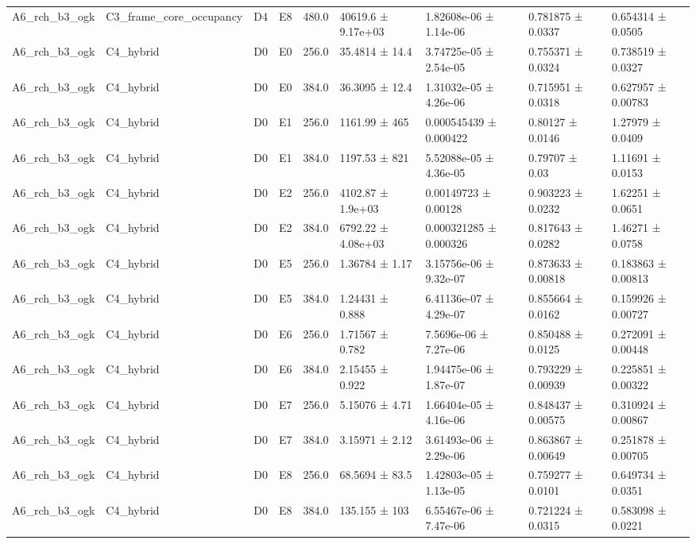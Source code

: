 \begin{table}
\begin{tabular}{lllllllll}
A6\_rch\_b3\_ogk & C3\_frame\_core\_occupancy & D4 & E8 & 480.0 & 40619.6 ± 9.17e+03 & 1.82608e-06 ± 1.14e-06 & 0.781875 ± 0.0337 & 0.654314 ± 0.0505 \\
A6\_rch\_b3\_ogk & C4\_hybrid & D0 & E0 & 256.0 & 35.4814 ± 14.4 & 3.74725e-05 ± 2.54e-05 & 0.755371 ± 0.0324 & 0.738519 ± 0.0327 \\
A6\_rch\_b3\_ogk & C4\_hybrid & D0 & E0 & 384.0 & 36.3095 ± 12.4 & 1.31032e-05 ± 4.26e-06 & 0.715951 ± 0.0318 & 0.627957 ± 0.00783 \\
A6\_rch\_b3\_ogk & C4\_hybrid & D0 & E1 & 256.0 & 1161.99 ± 465 & 0.000545439 ± 0.000422 & 0.80127 ± 0.0146 & 1.27979 ± 0.0409 \\
A6\_rch\_b3\_ogk & C4\_hybrid & D0 & E1 & 384.0 & 1197.53 ± 821 & 5.52088e-05 ± 4.36e-05 & 0.79707 ± 0.03 & 1.11691 ± 0.0153 \\
A6\_rch\_b3\_ogk & C4\_hybrid & D0 & E2 & 256.0 & 4102.87 ± 1.9e+03 & 0.00149723 ± 0.00128 & 0.903223 ± 0.0232 & 1.62251 ± 0.0651 \\
A6\_rch\_b3\_ogk & C4\_hybrid & D0 & E2 & 384.0 & 6792.22 ± 4.08e+03 & 0.000321285 ± 0.000326 & 0.817643 ± 0.0282 & 1.46271 ± 0.0758 \\
A6\_rch\_b3\_ogk & C4\_hybrid & D0 & E5 & 256.0 & 1.36784 ± 1.17 & 3.15756e-06 ± 9.32e-07 & 0.873633 ± 0.00818 & 0.183863 ± 0.00813 \\
A6\_rch\_b3\_ogk & C4\_hybrid & D0 & E5 & 384.0 & 1.24431 ± 0.888 & 6.41136e-07 ± 4.29e-07 & 0.855664 ± 0.0162 & 0.159926 ± 0.00727 \\
A6\_rch\_b3\_ogk & C4\_hybrid & D0 & E6 & 256.0 & 1.71567 ± 0.782 & 7.5696e-06 ± 7.27e-06 & 0.850488 ± 0.0125 & 0.272091 ± 0.00448 \\
A6\_rch\_b3\_ogk & C4\_hybrid & D0 & E6 & 384.0 & 2.15455 ± 0.922 & 1.94475e-06 ± 1.87e-07 & 0.793229 ± 0.00939 & 0.225851 ± 0.00322 \\
A6\_rch\_b3\_ogk & C4\_hybrid & D0 & E7 & 256.0 & 5.15076 ± 4.71 & 1.66404e-05 ± 4.16e-06 & 0.848437 ± 0.00575 & 0.310924 ± 0.00867 \\
A6\_rch\_b3\_ogk & C4\_hybrid & D0 & E7 & 384.0 & 3.15971 ± 2.12 & 3.61493e-06 ± 2.29e-06 & 0.863867 ± 0.00649 & 0.251878 ± 0.00705 \\
A6\_rch\_b3\_ogk & C4\_hybrid & D0 & E8 & 256.0 & 68.5694 ± 83.5 & 1.42803e-05 ± 1.13e-05 & 0.759277 ± 0.0101 & 0.649734 ± 0.0351 \\
A6\_rch\_b3\_ogk & C4\_hybrid & D0 & E8 & 384.0 & 135.155 ± 103 & 6.55467e-06 ± 7.47e-06 & 0.721224 ± 0.0315 & 0.583098 ± 0.0221 \\

\end{tabular}
\end{table}
